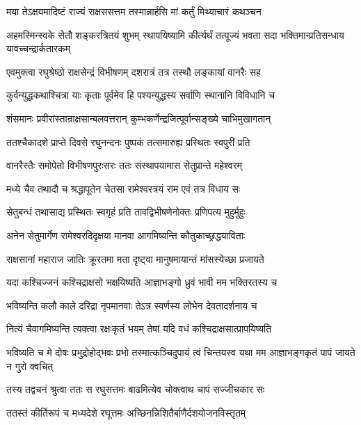 
\twolineshloka
{मया तेऽक्षयमादिष्टं राज्यं राक्षससत्तम}
{तस्मान्नार्हसि मां कर्तुं मिथ्याचारं कथञ्चन}%

\threelineshloka
{अहमस्मिन्स्वके सेतौ शङ्करत्रितयं शुभम्}
{स्थापयिष्यामि कीर्त्यर्थं तत्पूज्यं भवता सदा}
{भक्तिमान्प्रतिसन्धाय यावच्चन्द्रार्कतारकम्}%

\twolineshloka
{एवमुक्त्वा रघुश्रेष्ठो राक्षसेन्द्रं विभीषणम्}
{दशरात्रं तत्र तस्थौ लङ्कायां वानरैः सह}%

\twolineshloka
{कुर्वन्युद्धकथाश्चित्रा याः कृताः पूर्वमेव हि}
{पश्यन्युद्धस्य सर्वाणि स्थानानि विविधानि च}%

\twolineshloka
{शंसमानः प्रवीरांस्तान्राक्षसान्बलवत्तरान्}
{कुम्भकर्णेन्द्रजित्पूर्वान्सङ्ख्ये चाभिमुखागतान्}%

\twolineshloka
{ततश्चैकादशे प्राप्ते दिवसे रघुनन्दनः}
{पुष्पकं तत्समारुह्य प्रस्थितः स्वपुरीं प्रति}%

\twolineshloka
{वानरैस्तैः समोपेतो विभीषणपुरःसरः}
{ततः संस्थापयामास सेतुप्रान्ते महेश्वरम्}%

\twolineshloka
{मध्ये चैव तथादौ च श्रद्धापूतेन चेतसा}
{रामेश्वरत्रयं राम एवं तत्र विधाय सः}%

\twolineshloka
{सेतुबन्धं तथासाद्य प्रस्थितः स्वगृहं प्रति}
{तावद्विभीषणेनोक्तः प्रणिपत्य मुहुर्मुहुः}%


\twolineshloka
{अनेन सेतुमार्गेण रामेश्वरदिदृक्षया}
{मानवा आगमिष्यन्ति कौतुकाच्छ्रद्धयाविताः}%

\twolineshloka
{राक्षसानां महाराज जातिः क्रूरतमा मता}
{दृष्ट्वा मानुषमायान्तं मांसस्येच्छा प्रजायते}%

\twolineshloka
{यदा कश्चिज्जनं कश्चिद्राक्षसो भक्षयिष्यति}
{आज्ञाभङ्गो ध्रुवं भावी मम भक्तिरतस्य च}%

\twolineshloka
{भविष्यन्ति कलौ काले दरिद्रा नृपमानवाः}
{तेऽत्र स्वर्णस्य लोभेन देवतादर्शनाय च}%

\twolineshloka
{नित्यं चैवागमिष्यन्ति त्यक्त्वा रक्षःकृतं भयम्}
{तेषां यदि वधं कश्चिद्राक्षसात्प्रापयिष्यति}%

\threelineshloka
{भविष्यति च मे दोषः प्रभुद्रोहोद्भवः प्रभो}
{तस्मात्कञ्चिदुपायं त्वं चिन्तयस्व यथा मम}
{आज्ञाभङ्गकृतं पापं जायते न गुरो क्वचित्}%

\twolineshloka
{तस्य तद्वचनं श्रुत्वा ततः स रघुसत्तमः}
{बाढमित्येव चोक्त्वाथ चापं सज्जीचकार सः}%

\twolineshloka
{ततस्तं कीर्तिरूपं च मध्यदेशे रघूत्तमः}
{अच्छिनन्निशितैर्बाणैर्दशयोजनविस्तृतम्}%

